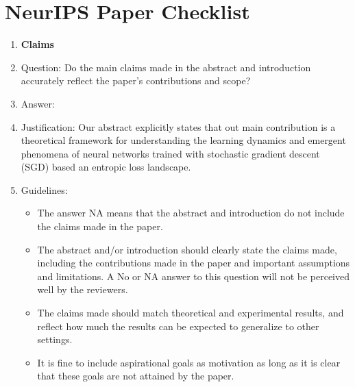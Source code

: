 \documentclass{article}
\theoremstyle{plain}
\begin{document}
\section*{NeurIPS Paper Checklist}
\begin{enumerate}

\item {\bf Claims}
    \item[] Question: Do the main claims made in the abstract and introduction accurately reflect the paper's contributions and scope?
    \item[] Answer: \answerYes{}
    \item[] Justification: Our abstract explicitly states that out main contribution is a theoretical framework for understanding the learning dynamics and emergent phenomena of neural networks trained with stochastic gradient descent (SGD) based an entropic loss landscape.
    \item[] Guidelines:
    \begin{itemize}
        \item The answer NA means that the abstract and introduction do not include the claims made in the paper.
        \item The abstract and/or introduction should clearly state the claims made, including the contributions made in the paper and important assumptions and limitations. A No or NA answer to this question will not be perceived well by the reviewers. 
        \item The claims made should match theoretical and experimental results, and reflect how much the results can be expected to generalize to other settings. 
        \item It is fine to include aspirational goals as motivation as long as it is clear that these goals are not attained by the paper. 
    \end{itemize}


\end{enumerate}
\end{document}
